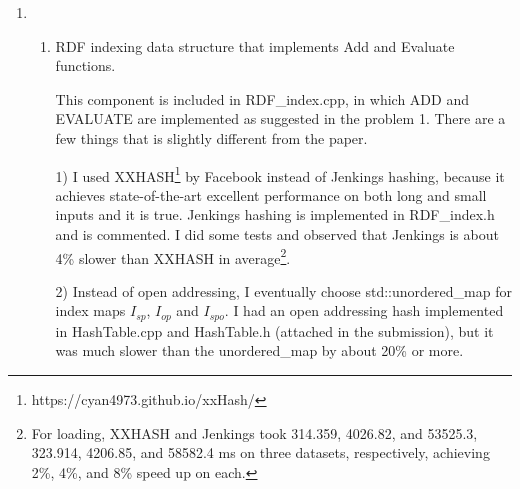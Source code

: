 \documentclass{article}
\begin{document}
\begin{enumerate}
\begin{enumerate}
\begin{algorithm}[H]
\caption{Evaluate $\langle X, Y, o\rangle$}\label{alg:evaluateXYO}
\begin{algorithmic}
\Require $t = \langle X, Y, o\rangle$, where $X$ and $Y$ are special codes stand for variables. 
\Do
{}
\State $t'\leftarrow$ the triple $I_{o}$ points to, \textit{index} $\leftarrow$ $t'.N_{op}$.
\Else 
\State $t'\leftarrow t.N_{op}$, \textit{index} $\leftarrow t'.N_{op}$
\EndIf
{}
\State \textit{index} = \textit{EndSearch}
\EndIf
\end{algorithmic}
\end{algorithm}
The idea for the other two patterns is similar; starts from $I_p$ or $I_s$ map and traverse the $p$-list or $sp$-list.

When there are three free variables, the paper suggests to match, for example, the patterns like $\langle X, Y, Z\rangle$, we need to iterate over the triple table; if we want $X = Y$,  we skip those $X\neq Y$. However, this is not efficient. Therefore, I modified a little bit and the idea and pseudo-code are discussed in 2.a, where I put everything that is different from paper there. 

\end{enumerate}
\item 
\begin{enumerate}
\item RDF indexing data structure that implements Add and Evaluate functions.

This component is included in RDF\_index.cpp, in which ADD and EVALUATE are implemented as suggested in the problem 1. There are a few things that is slightly different from the paper. 

1) I used XXHASH\footnote{https://cyan4973.github.io/xxHash/} by Facebook instead of Jenkings hashing, because it achieves state-of-the-art excellent performance on both long and small inputs and it is true. Jenkings hashing is implemented in RDF\_index.h and is commented. I did some tests and observed that Jenkings is about 4\% slower than XXHASH in average\footnote{For loading, XXHASH and Jenkings took 314.359, 4026.82, and 53525.3,  323.914, 4206.85, and 58582.4 ms on three datasets, respectively, achieving 2\%, 4\%, and 8\% speed up on each.}. 

2) Instead of open addressing, I eventually choose std::unordered\_map for index maps $I_{sp}$, $I_{op}$ and $I_{spo}$. I had an open addressing hash implemented in HashTable.cpp and HashTable.h (attached in the submission), but it was much slower than the unordered\_map by about 20\% or more.


\end{enumerate}
\end{enumerate}
\end{document}
